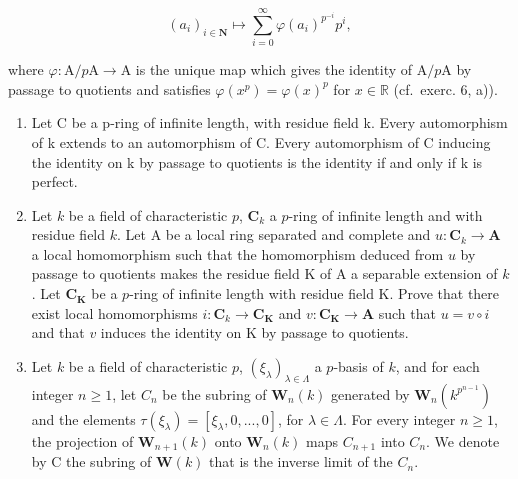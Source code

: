 \[
(a _ {i}) _ {i \in \mathbf {N}} \mapsto \sum_ {i = 0} ^ {\infty} \varphi (a _ {i}) ^ {p ^ {- i}} p ^ {i},
\]

where \(\varphi : \mathrm{A} / p\mathrm{A} \to \mathrm{A}\) is the unique map which gives the identity of \(\mathrm{A} / p\mathrm{A}\) by passage to quotients and satisfies \(\varphi(x^p) = \varphi(x)^p\) for \(x \in \mathbb{R}\) (cf.~exerc. 6, a)).

\begin{enumerate}
\def\labelenumi{\arabic{enumi})}
\setcounter{enumi}{7}
\item
  Let C be a p-ring of infinite length, with residue field k. Every automorphism of k extends to an automorphism of C. Every automorphism of C inducing the identity on k by passage to quotients is the identity if and only if k is perfect.
\item
  Let \(k\) be a field of characteristic \(p\), \(\mathbf{C}_k\) a \(p\)-ring of infinite length and with residue field \(k\). Let A be a local ring separated and complete and \(u: \mathbf{C}_k \to \mathbf{A}\) a local homomorphism such that the homomorphism deduced from \(u\) by passage to quotients makes the residue field K of A a separable extension of \(k\). Let \(\mathbf{C}_{\mathbf{K}}\) be a \(p\)-ring of infinite length with residue field K. Prove that there exist local homomorphisms \(i: \mathbf{C}_k \to \mathbf{C}_{\mathbf{K}}\) and \(v: \mathbf{C}_{\mathbf{K}} \to \mathbf{A}\) such that \(u = v \circ i\) and that \(v\) induces the identity on K by passage to quotients.
\item
  Let \(k\) be a field of characteristic \(p\), \((\xi_{\lambda})_{\lambda \in \Lambda}\) a \(p\)-basis of \(k\), and for each integer \(n \geqslant 1\), let \(C_n\) be the subring of \(\mathbf{W}_n(k)\) generated by \(\mathbf{W}_n(k^{p^{n-1}})\) and the elements \(\tau(\xi_{\lambda}) = [\xi_{\lambda}, 0, ..., 0]\), for \(\lambda \in \Lambda\). For every integer \(n \geqslant 1\), the projection of \(\mathbf{W}_{n+1}(k)\) onto \(\mathbf{W}_n(k)\) maps \(C_{n+1}\) into \(C_n\). We denote by C the subring of \(\mathbf{W}(k)\) that is the inverse limit of the \(C_n\).
\end{enumerate}

